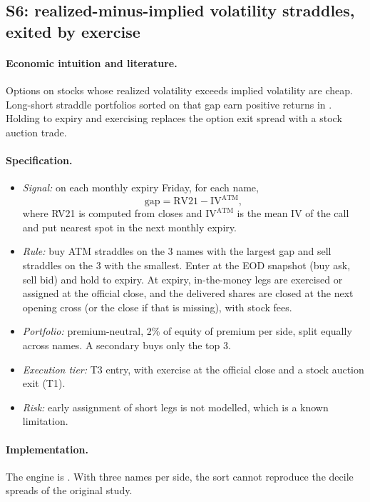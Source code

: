 \documentclass[../main.tex]{subfiles}
\begin{document}
\subsection{S6: realized-minus-implied volatility straddles, exited by exercise}\label{sec:s6}

\paragraph{Economic intuition and literature.}
Options on stocks whose realized volatility exceeds implied volatility are cheap. Long-short straddle portfolios sorted on that gap earn positive returns in \citet{goyal2009}. Holding to expiry and exercising replaces the option exit spread with a stock auction trade.

\paragraph{Specification.}
\begin{itemize}
\item \emph{Signal:} on each monthly expiry Friday, for each name,
\begin{equation}
\mathrm{gap} = \mathrm{RV21} - \mathrm{IV}^{\mathrm{ATM}},
\end{equation}
where RV21 is computed from closes and $\mathrm{IV}^{\mathrm{ATM}}$ is the mean IV of the call and put nearest spot in the next monthly expiry.
\item \emph{Rule:} buy ATM straddles on the 3 names with the largest gap and sell straddles on the 3 with the smallest. Enter at the EOD snapshot (buy ask, sell bid) and hold to expiry. At expiry, in-the-money legs are exercised or assigned at the official close, and the delivered shares are closed at the next opening cross (or the close if that is missing), with stock fees.
\item \emph{Portfolio:} premium-neutral, 2\% of equity of premium per side, split equally across names. A secondary buys only the top 3.
\item \emph{Execution tier:} T3 entry, with exercise at the official close and a stock auction exit (T1).
\item \emph{Risk:} early assignment of short legs is not modelled, which is a known limitation.
\end{itemize}

\paragraph{Implementation.}
The engine is . With three names per side, the sort cannot reproduce the decile spreads of the original study.
\end{document}
